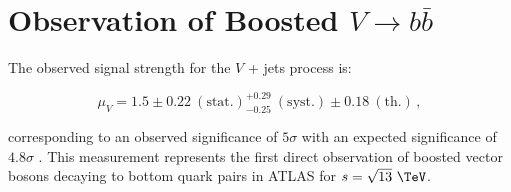 \section{Observation of Boosted $V \rightarrow b\bar{b}$} \label{sec:results:v_jets}

The observed signal strength for the $V$ + jets process is:

$$ \mu_{V} = 1.5 \pm 0.22~\mathrm{(stat.)}^{+0.29}_{-0.25}~\mathrm{(syst.)} \pm 0.18~\mathrm{(th.)}\,, $$

corresponding to an observed significance of $5\sigma$ with an expected
significance of $4.8\sigma$ \Cite{Feickert:HiggsCouplings2018}.  This
measurement represents the first direct observation of boosted vector bosons
decaying to bottom quark pairs in ATLAS for $s = \sqrt{13}~\TeV$.
